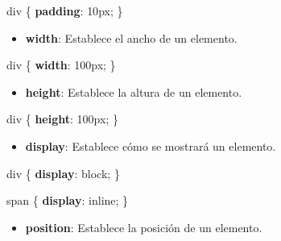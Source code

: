 \documentclass[
  a4paper,
  DIV=11,
  numbers=noendperiod,
  onepage,
  openany]{scrreprt}
\newenvironment{Shaded}{\begin{snugshade}}{\end{snugshade}}
\newcommand{\CharTok}[1]{\textcolor[rgb]{0.13,0.47,0.30}{#1}}
\newcommand{\DataTypeTok}[1]{\textcolor[rgb]{0.68,0.00,0.00}{#1}}
\newcommand{\DecValTok}[1]{\textcolor[rgb]{0.68,0.00,0.00}{#1}}
\newcommand{\KeywordTok}[1]{\textcolor[rgb]{0.00,0.23,0.31}{\textbf{#1}}}
\newcommand{\NormalTok}[1]{\textcolor[rgb]{0.00,0.23,0.31}{#1}}
\newcommand{\OperatorTok}[1]{\textcolor[rgb]{0.37,0.37,0.37}{#1}}
\providecommand{\tightlist}{%
  \setlength{\itemsep}{0pt}\setlength{\parskip}{0pt}}\usepackage{longtable,booktabs,array}
\begin{document}
\begin{tcolorbox}
\begin{Shaded}
\begin{Highlighting}[]
\NormalTok{div \{}
  \KeywordTok{padding}\CharTok{:} \DecValTok{10}\DataTypeTok{px}\OperatorTok{;}
\NormalTok{\}}
\end{Highlighting}
\end{Shaded}

\begin{itemize}
\tightlist
\item
  \textbf{width}: Establece el ancho de un elemento.
\end{itemize}

\begin{Shaded}
\begin{Highlighting}[]
\NormalTok{div \{}
  \KeywordTok{width}\CharTok{:} \DecValTok{100}\DataTypeTok{px}\OperatorTok{;}
\NormalTok{\}}
\end{Highlighting}
\end{Shaded}

\begin{itemize}
\tightlist
\item
  \textbf{height}: Establece la altura de un elemento.
\end{itemize}

\begin{Shaded}
\begin{Highlighting}[]
\NormalTok{div \{}
  \KeywordTok{height}\CharTok{:} \DecValTok{100}\DataTypeTok{px}\OperatorTok{;}
\NormalTok{\}}
\end{Highlighting}
\end{Shaded}

\begin{itemize}
\tightlist
\item
  \textbf{display}: Establece cómo se mostrará un elemento.
\end{itemize}

\begin{Shaded}
\begin{Highlighting}[]
\NormalTok{div \{}
  \KeywordTok{display}\CharTok{:} \DecValTok{block}\OperatorTok{;}
\NormalTok{\}}

\NormalTok{span \{}
  \KeywordTok{display}\CharTok{:} \DecValTok{inline}\OperatorTok{;}
\NormalTok{\}}
\end{Highlighting}
\end{Shaded}

\begin{itemize}
\tightlist
\item
  \textbf{position}: Establece la posición de un elemento.
\end{itemize}


\end{tcolorbox}
\end{document}
